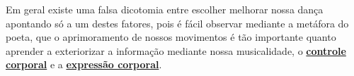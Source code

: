 Em geral existe uma falsa dicotomia entre escolher melhorar nossa dança apontando só a 
um destes fatores, pois é fácil observar mediante a metáfora do poeta,
que o aprimoramento de nossos movimentos é tão importante quanto aprender 
a exteriorizar a informação mediante nossa musicalidade,
o \hyperref[sec:BodyControl]{\textbf{controle corporal}} e
a \hyperref[sec:BodyExpression]{\textbf{expressão corporal}}.  


